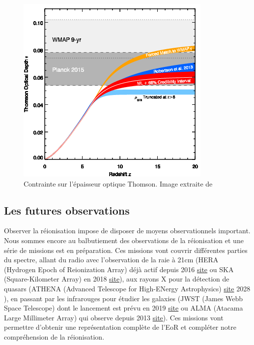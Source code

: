 \begin{figure}
        \includegraphics[width=.9\linewidth]{img/01/epaisseur_optique_thomson.png} 
        \caption[Epaisseur optique Thomson]{%
		Contrainte sur l'épaisseur optique Thomson.
        Image extraite de \cite{2015ApJ...802L..19R}
 		\label{fig:epaisseur_optique_thomson} }
\end{figure}



\subsection{Les futures observations}


Observer la réionisation impose de disposer de moyens observationnels important.
Nous sommes encore au balbutiement des observations de la réionisation et une série de missions est en préparation.
Ces missions vont couvrir différentes parties du spectre, allant du radio avec l'observation de la raie à 21cm (HERA (Hydrogen Epoch of Reionization Array) déjà actif depuis 2016 \href{http://reionization.org/}{site} ou SKA (Square-Kilometer Array) en 2018 \href{https://skatelescope.org/}{site}), aux rayons X pour la détection de quasars (ATHENA (Advanced Telescope for High-ENergy Astrophysics)  \href{https://athena.cnes.fr/}{site} 2028 ), en passant par les infrarouges pour étudier les galaxies (JWST (James Webb Space Telescope) dont le lancement est prévu en 2019 \href{https://www.jwst.nasa.gov/}{site} ou ALMA (Atacama Large Millimeter Array) qui observe depuis 2013 \href{http://www.eso.org/public/teles-instr/alma/}{site}).
Ces missions vont permettre d'obtenir une représentation complète de l'\ac{EoR} et compléter notre compréhension de la réionisation.

